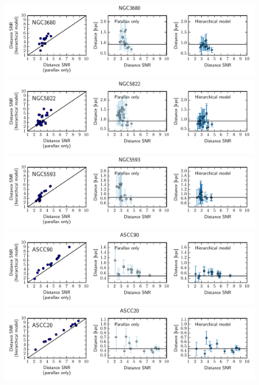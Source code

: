\documentclass[manuscript, letterpaper]{aastex6}
\begin{document}
\begin{figure}
\hspace*{-3mm}\includegraphics[width=15.5cm, trim = 0cm 1.6cm 0cm 0.6cm, clip]{NGC3680_metrics}
\hspace*{-3mm}\includegraphics[width=15.5cm, trim = 0cm 1.6cm 0cm 0.6cm, clip]{NGC5822_metrics}
\hspace*{-3mm}\includegraphics[width=15.5cm, trim = 0cm 1.6cm 0cm 0.6cm, clip]{NGC5593_metrics}
\hspace*{-3mm}\includegraphics[width=15.5cm, trim = 0cm 1.6cm 0cm 0.6cm, clip]{ASCC90_metrics}
\hspace*{-3mm}\includegraphics[width=15.5cm, trim = 0cm 1.6cm 0cm 0.6cm, clip]{ASCC20_metrics}

\end{figure}
\end{document}
